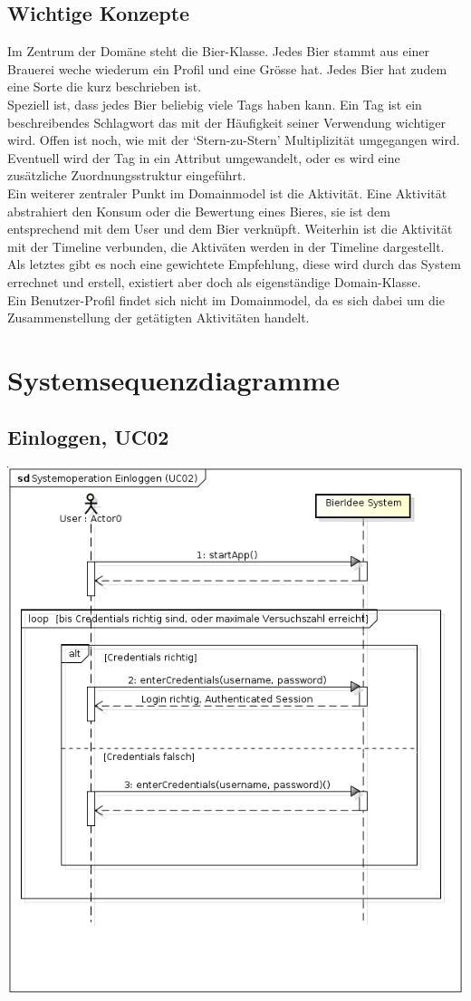 \documentclass[10pt,a4paper]{scrartcl}
\begin{document}
\subsection{Wichtige Konzepte}
Im Zentrum der Domäne steht die Bier-Klasse. Jedes Bier stammt aus einer Brauerei weche wiederum ein Profil und eine Grösse hat. Jedes Bier hat zudem eine Sorte die kurz beschrieben ist.\\
Speziell ist, dass jedes Bier beliebig viele Tags haben kann. Ein Tag ist ein beschreibendes Schlagwort das mit der Häufigkeit seiner Verwendung wichtiger wird. Offen ist noch, wie mit der `Stern-zu-Stern' Multiplizität umgegangen wird. Eventuell wird der Tag in ein Attribut umgewandelt, oder es wird eine zusätzliche Zuordnungsstruktur eingeführt.\\
Ein weiterer zentraler Punkt im Domainmodel ist die Aktivität. Eine Aktivität abstrahiert den Konsum oder die Bewertung eines Bieres, sie ist dem entsprechend mit dem User und dem Bier verknüpft. Weiterhin ist die Aktivität mit der Timeline verbunden, die Aktiväten werden in der Timeline dargestellt.\\
Als letztes gibt es noch eine gewichtete Empfehlung, diese wird durch das System errechnet und erstell, existiert aber doch als eigenständige Domain-Klasse.\\
Ein Benutzer-Profil findet sich nicht im Domainmodel, da es sich dabei um die Zusammenstellung der getätigten Aktivitäten handelt.

\section{Systemsequenzdiagramme}
\subsection{Einloggen, UC02}
\includegraphics[width=\textwidth]{ssd_uc02.png}
\end{document}
